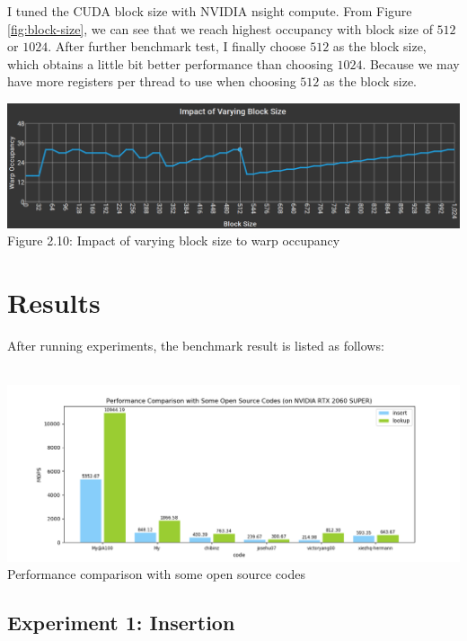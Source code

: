 \documentclass[10pt,twocolumn,letterpaper]{article}
\begin{document}
I tuned the CUDA block size with NVIDIA nsight compute. From Figure \ref{fig:block-size}, we can see that we reach highest occupancy with block size of $512$ or $1024$. After further benchmark test, I finally choose $512$ as the block size, which obtains a little bit better performance than choosing $1024$. Because we may have more registers per thread to use when choosing $512$ as the block size.

\begin{strip}
    \centering
    \includegraphics[scale=0.7]{figures/occupancy-block-size.png}
    \label{fig:block-size}
    Figure 2.10: Impact of varying block size to warp occupancy 
\end{strip}

\section{Results}

After running experiments, the benchmark result is listed as follows:\\\\

\begin{strip}
    \centering
    \includegraphics[scale=0.5]{figures/cmp.png}
    \label{fig:cmp}
    Performance comparison with some open source codes
\end{strip}


\subsection{Experiment 1: Insertion}
\end{document}
